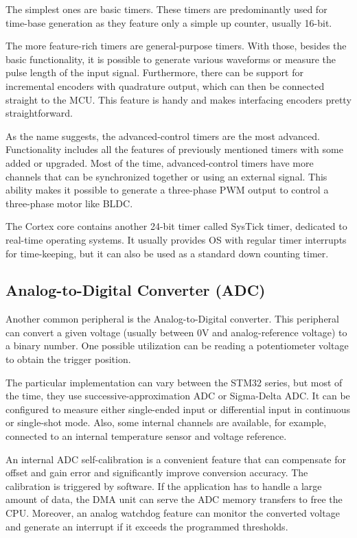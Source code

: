 The simplest ones are basic timers. These timers are predominantly used for time-base generation as they feature only a simple up counter, usually 16-bit.

The more feature-rich timers are general-purpose timers. With those, besides the basic functionality, it is possible to generate various waveforms or measure the pulse length of the input signal. Furthermore, there can be support for incremental encoders with quadrature output, which can then be connected straight to the MCU. This feature is handy and makes interfacing encoders pretty straightforward.

As the name suggests, the advanced-control timers are the most advanced. Functionality includes all the features of previously mentioned timers with some added or upgraded. Most of the time, advanced-control timers have more channels that can be synchronized together or using an external signal. This ability makes it possible to generate a three-phase PWM output to control a three-phase motor like BLDC.

The Cortex core contains another 24-bit timer called SysTick timer, dedicated to real-time operating systems. It usually provides OS with regular timer interrupts for time-keeping, but it can also be used as a standard down counting timer.

	\subsection{Analog-to-Digital Converter (ADC)}
	\label{sub:st_adc}
Another common peripheral is the Analog-to-Digital converter. This peripheral can convert a given voltage (usually between 0V and analog-reference voltage) to a binary number. One possible utilization can be reading a potentiometer voltage to obtain the trigger position.

The particular implementation can vary between the STM32 series, but most of the time, they use successive-approximation ADC or Sigma-Delta ADC. It can be configured to measure either single-ended input or differential input in continuous or single-shot mode. Also, some internal channels are available, for example, connected to an internal temperature sensor and voltage reference.

An internal ADC self-calibration is a convenient feature that can compensate for offset and gain error and significantly improve conversion accuracy. The calibration is triggered by software. If the application has to handle a large amount of data, the DMA unit can serve the ADC memory transfers to free the CPU. Moreover, an analog watchdog feature can monitor the converted voltage and generate an interrupt if it exceeds the programmed thresholds. 

